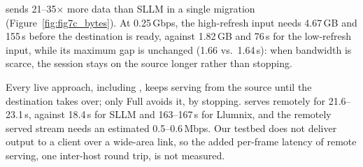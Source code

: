 \sys sends 21--35$\times$ more data than SLLM in a single migration (Figure~\ref{fig:fig7c_bytes}).
At 0.25\,Gbps, the high-refresh input needs 4.67\,GB and 155\,s before the destination is ready, against 1.82\,GB and
76\,s for the low-refresh input, while its maximum gap is unchanged (1.66 vs.\ 1.64\,s): when bandwidth is scarce, the
session stays on the source longer rather than stopping.

Every live approach, including \sys, keeps serving from the source until the destination takes over; only Full avoids
it, by stopping.
\sys serves remotely for 21.6--23.1\,s, against 18.4\,s for SLLM and 163--167\,s for Llumnix, and the
remotely served stream needs an estimated 0.5--0.6\,Mbps.
Our testbed does not deliver output to a client over a wide-area link, so the added per-frame latency of remote
serving, one inter-host round trip, is not measured.

